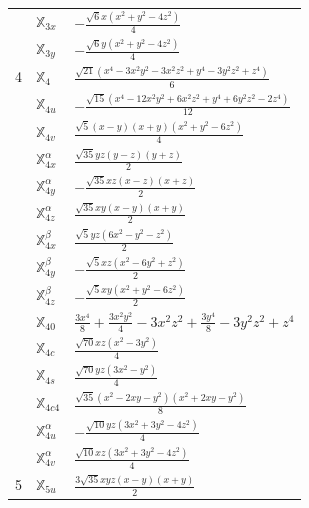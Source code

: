 \documentclass[fleqn,9pt,landscape]{jsarticle}
\begin{document}
\begin{longtable}{cll}
 & $\mathbb{X}_{3x}$ & $- \frac{\sqrt{6} x \left(x^{2} + y^{2} - 4 z^{2}\right)}{4}$ \\
 & $\mathbb{X}_{3y}$ & $- \frac{\sqrt{6} y \left(x^{2} + y^{2} - 4 z^{2}\right)}{4}$ \\ \hline
4 & $\mathbb{X}_{4}$ & $\frac{\sqrt{21} \left(x^{4} - 3 x^{2} y^{2} - 3 x^{2} z^{2} + y^{4} - 3 y^{2} z^{2} + z^{4}\right)}{6}$ \\
 & $\mathbb{X}_{4u}$ & $- \frac{\sqrt{15} \left(x^{4} - 12 x^{2} y^{2} + 6 x^{2} z^{2} + y^{4} + 6 y^{2} z^{2} - 2 z^{4}\right)}{12}$ \\
 & $\mathbb{X}_{4v}$ & $\frac{\sqrt{5} \left(x - y\right) \left(x + y\right) \left(x^{2} + y^{2} - 6 z^{2}\right)}{4}$ \\
 & $\mathbb{X}_{4x}^{\alpha}$ & $\frac{\sqrt{35} y z \left(y - z\right) \left(y + z\right)}{2}$ \\
 & $\mathbb{X}_{4y}^{\alpha}$ & $- \frac{\sqrt{35} x z \left(x - z\right) \left(x + z\right)}{2}$ \\
 & $\mathbb{X}_{4z}^{\alpha}$ & $\frac{\sqrt{35} x y \left(x - y\right) \left(x + y\right)}{2}$ \\
 & $\mathbb{X}_{4x}^{\beta}$ & $\frac{\sqrt{5} y z \left(6 x^{2} - y^{2} - z^{2}\right)}{2}$ \\
 & $\mathbb{X}_{4y}^{\beta}$ & $- \frac{\sqrt{5} x z \left(x^{2} - 6 y^{2} + z^{2}\right)}{2}$ \\
 & $\mathbb{X}_{4z}^{\beta}$ & $- \frac{\sqrt{5} x y \left(x^{2} + y^{2} - 6 z^{2}\right)}{2}$ \\
 & $\mathbb{X}_{40}$ & $\frac{3 x^{4}}{8} + \frac{3 x^{2} y^{2}}{4} - 3 x^{2} z^{2} + \frac{3 y^{4}}{8} - 3 y^{2} z^{2} + z^{4}$ \\
 & $\mathbb{X}_{4c}$ & $\frac{\sqrt{70} x z \left(x^{2} - 3 y^{2}\right)}{4}$ \\
 & $\mathbb{X}_{4s}$ & $\frac{\sqrt{70} y z \left(3 x^{2} - y^{2}\right)}{4}$ \\
 & $\mathbb{X}_{4c4}$ & $\frac{\sqrt{35} \left(x^{2} - 2 x y - y^{2}\right) \left(x^{2} + 2 x y - y^{2}\right)}{8}$ \\
 & $\mathbb{X}_{4u}^{\alpha}$ & $- \frac{\sqrt{10} y z \left(3 x^{2} + 3 y^{2} - 4 z^{2}\right)}{4}$ \\
 & $\mathbb{X}_{4v}^{\alpha}$ & $\frac{\sqrt{10} x z \left(3 x^{2} + 3 y^{2} - 4 z^{2}\right)}{4}$ \\ \hline
5 & $\mathbb{X}_{5u}$ & $\frac{3 \sqrt{35} x y z \left(x - y\right) \left(x + y\right)}{2}$ \\

\end{longtable}
\end{document}
